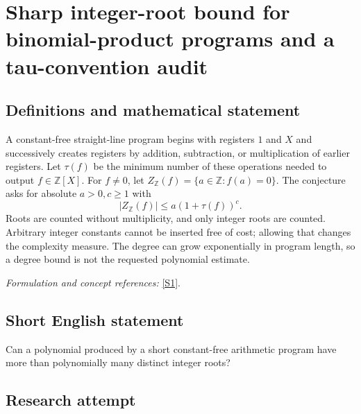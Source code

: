 \documentclass[11pt,a4paper]{article}
\newcommand{\Z}{\mathbb{Z}}
\newcommand{\sref}[2]{\hyperlink{source:#1:#2}{[S#2]}}
\newif\ifshowcatalogue
\newcommand{\cataloguescope}[1]{\ifshowcatalogue
 \paragraph{Exact scope in the supplied catalogue.}
 \begin{quote}\small #1\end{quote}\fi}
\numberwithin{equation}{section}
\begin{document}
\setcounter{section}{0}
\clearpage
\section*{\texorpdfstring{Sharp integer-root bound for binomial-product programs and a tau-convention audit}{Sharp integer-root bound for binomial-product programs and a tau-convention audit}}\label{statement}
\subsection{Definitions and mathematical statement}
A constant-free straight-line program begins with registers $1$ and $X$ and successively creates registers by addition, subtraction, or multiplication of earlier registers. Let $\tau(f)$ be the minimum number of these operations needed to output $f\in\Z[X]$. For $f\ne0$, let $Z_{\Z}(f)=\{a\in\Z:f(a)=0\}$. The conjecture asks for absolute $a>0,c\ge1$ with
\[
 |Z_{\Z}(f)|\le a(1+\tau(f))^c.
\]
Roots are counted without multiplicity, and only integer roots are counted. Arbitrary integer constants cannot be inserted free of cost; allowing that changes the complexity measure. The degree can grow exponentially in program length, so a degree bound is not the requested polynomial estimate.
\par\smallskip\textit{Formulation and concept references:} \sref{statement}{1}.
\cataloguescope{Determine whether universal constants a > 0 and c >= 1 exist such that every nonzero polynomial f in Z[x] has at most a(1 + tau(f))\textasciicircum{}c distinct integer zeros, where tau(f) is the shortest constant-free straight-line-program length using addition, subtraction, and multiplication, starting from 1 and x.}
\subsection{Short English statement}
Can a polynomial produced by a short constant-free arithmetic program have more than polynomially many distinct integer roots?
\subsection{Research attempt}
\end{document}
